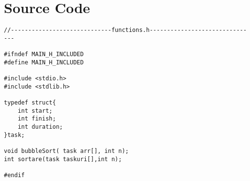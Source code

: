 \documentclass[14pt]{article}
\begin{document}
\section*{Source Code}
\begin{lstlisting}
//-----------------------------functions.h-------------------------------

#ifndef MAIN_H_INCLUDED
#define MAIN_H_INCLUDED

#include <stdio.h>
#include <stdlib.h>

typedef struct{
    int start;
    int finish;
    int duration;
}task;

void bubbleSort( task arr[], int n);
int sortare(task taskuri[],int n);

#endif



\end{lstlisting}
\end{document}
